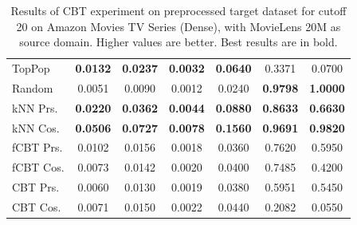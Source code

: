 \begin{table}[hbt]
\begin{tabulary}{\textwidth}{|L|CCCCCC|}
TopPop & \textbf{0.0132} & \textbf{0.0237} & \textbf{0.0032} & \textbf{0.0640} & 0.3371 & 0.0700 \\
Random & 0.0051 & 0.0090 & 0.0012 & 0.0240 & \textbf{0.9798} & \textbf{1.0000} \\
kNN Prs. & \textbf{0.0220} & \textbf{0.0362} & \textbf{0.0044} & \textbf{0.0880} & \textbf{0.8633} & \textbf{0.6630} \\
kNN Cos. & \textbf{0.0506} & \textbf{0.0727} & \textbf{0.0078} & \textbf{0.1560} & \textbf{0.9691} & \textbf{0.9820} \\
fCBT Prs. & 0.0102 & 0.0156 & 0.0018 & 0.0360 & 0.7620 & 0.5950 \\
fCBT Cos. & 0.0073 & 0.0142 & 0.0020 & 0.0400 & 0.7485 & 0.4200 \\
CBT Prs. & 0.0060 & 0.0130 & 0.0019 & 0.0380 & 0.5951 & 0.5450 \\
CBT Cos. & 0.0071 & 0.0150 & 0.0022 & 0.0440 & 0.2082 & 0.0550 \\
\hline
\end{tabulary}
\caption{Results of CBT experiment on preprocessed target dataset for cutoff 20 on Amazon Movies TV Series (Dense), with MovieLens 20M as source domain. Higher values are better. Best results are in bold.}
\end{table}

